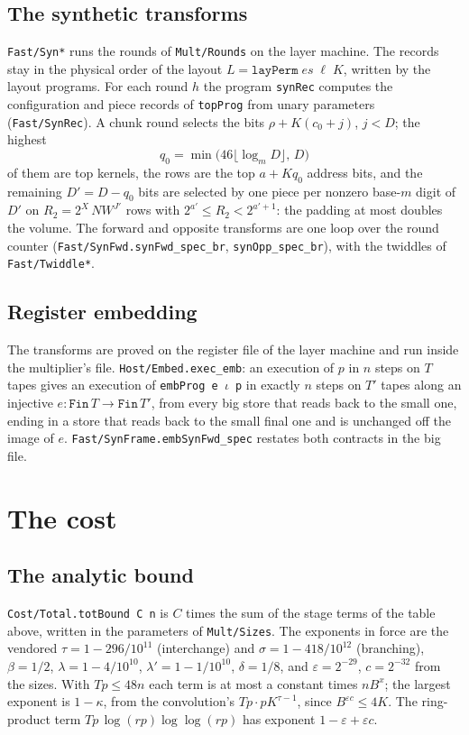 \documentclass[11pt]{amsart}
\theoremstyle{remark}
\begin{document}
\subsection*{The synthetic transforms}
\texttt{Fast/Syn*} runs the rounds of \texttt{Mult/Rounds} on the layer machine. The records
stay in the physical order of the layout $L=\texttt{layPerm}\;es\;\ell\;K$, written by the
layout programs. For each round $h$ the program \texttt{synRec} computes the configuration and
piece records of \texttt{topProg} from unary parameters (\texttt{Fast/SynRec}). A chunk round
selects the bits $\rho+K(c_0+j)$, $j<D$; the highest
\[
 q_0=\min\bigl(46\lfloor\log_mD\rfloor,\,D\bigr)
\]
of them are top kernels, the rows are the top $a+Kq_0$ address bits, and the remaining
$D'=D-q_0$ bits are selected by one piece per nonzero base-$m$ digit of $D'$ on
$R_2=2^X\,NW^{J'}$ rows with $2^{a'}\le R_2<2^{a'+1}$: the padding at most doubles the volume.
The forward and opposite transforms are one loop over the round counter
(\texttt{Fast/SynFwd.synFwd\_spec\_br}, \texttt{synOpp\_spec\_br}), with the twiddles of
\texttt{Fast/Twiddle*}.

\subsection*{Register embedding}
The transforms are proved on the register file of the layer machine and run inside the
multiplier's file. \texttt{Host/Embed.exec\_emb}: an execution of $p$ in $n$ steps on $T$
tapes gives an execution of \texttt{embProg e $\iota$ p} in exactly $n$ steps on $T'$ tapes along an
injective $e:\texttt{Fin}\,T\to\texttt{Fin}\,T'$, from every big store that reads back to the
small one, ending in a store that reads back to the small final one and is unchanged off the
image of $e$. \texttt{Fast/SynFrame.embSynFwd\_spec} restates both contracts in the big file.

\section{The cost}

\subsection*{The analytic bound}
\texttt{Cost/Total.totBound C n} is $C$ times the sum of the stage terms of the table above,
written in the parameters of \texttt{Mult/Sizes}. The exponents in force are the vendored
$\tau=1-296/10^{11}$ (interchange) and $\sigma=1-418/10^{12}$ (branching),
$\beta=1/2$, $\lambda=1-4/10^{10}$, $\lambda'=1-1/10^{10}$, $\delta=1/8$, and
$\varepsilon=2^{-29}$, $c=2^{-32}$ from the sizes. With $Tp\le48n$ each term is at most a
constant times $nB^x$; the largest exponent is $1-\kappa$, from the convolution's
$Tp\cdot pK^{\tau-1}$, since $B^{\varepsilon c}\le 4K$. The ring-product term
$Tp\,\log(rp)\log\log(rp)$ has exponent $1-\varepsilon+\varepsilon c$.
\end{document}
